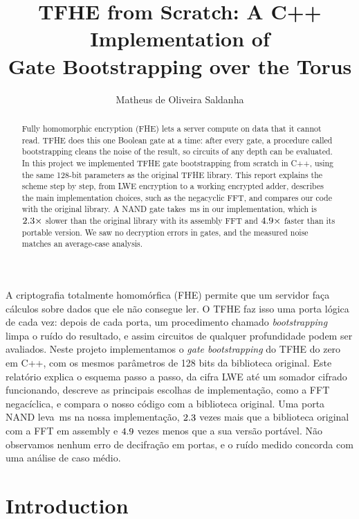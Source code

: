 \documentclass[12pt]{article}
\title{TFHE from Scratch: A C++ Implementation of\\Gate Bootstrapping over the Torus}
\author{Matheus de Oliveira Saldanha}
\theoremstyle{plain}
\theoremstyle{definition}
\begin{document}
\maketitle

\begin{abstract}
Fully homomorphic encryption (FHE) lets a server compute on data that it
cannot read. TFHE does this one Boolean gate at a time: after every gate, a
procedure called bootstrapping cleans the noise of the result, so circuits of
any depth can be evaluated. In this project we implemented TFHE gate
bootstrapping from scratch in C++, using the same 128-bit parameters as the
original TFHE library. This report explains the scheme step by step, from LWE
encryption to a working encrypted adder, describes the main implementation
choices, such as the negacyclic FFT, and compares our code with the original library. A NAND gate
takes \OurNandMean\,ms in our implementation, which is $2.3\times$
slower than the original library with its assembly FFT and $4.9\times$
faster than its portable version. We saw no decryption errors in \TotalGates{}
gates, and the measured noise matches an average-case analysis.
\end{abstract}

\begin{resumo}
%
A criptografia totalmente homomórfica (FHE) permite que um servidor faça
cálculos sobre dados que ele não consegue ler. O TFHE faz isso uma porta lógica
de cada vez: depois de cada porta, um procedimento chamado \emph{bootstrapping}
limpa o ruído do resultado, e assim circuitos de qualquer profundidade podem
ser avaliados. Neste projeto implementamos o \emph{gate bootstrapping} do TFHE
do zero em C++, com os mesmos parâmetros de 128 bits da biblioteca original.
Este relatório explica o esquema passo a passo, da cifra LWE até um somador
cifrado funcionando, descreve as principais escolhas de implementação, como a FFT
negacíclica, e compara o nosso código com a biblioteca original. Uma porta NAND leva
\OurNandMean\,ms na nossa implementação, $2.3$ vezes mais que a
biblioteca original com a FFT em assembly e $4.9$ vezes menos que a sua
versão portável. Não observamos nenhum erro de decifração em \TotalGates{}
portas, e o ruído medido concorda com uma análise de caso médio.
%
\end{resumo}

\section{Introduction}
\label{sec:intro}
\end{document}
